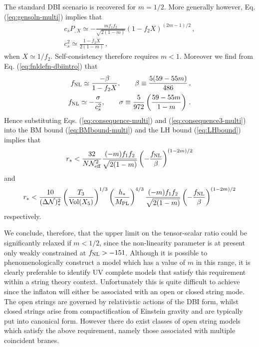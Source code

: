 The standard DBI scenario is recovered for $m=1/2$. 
More generally however, Eq. (\ref{eq:gensoln-multi}) implies that  
% 
\begin{eqnarray}
\label{eq:consequence-multi}
c_sP_{,X} \simeq -\frac{m f_1 f_2}{\sqrt{2(1-m)}} \left( 
1- f_2X \right)^{(2m-1)/2} \,,
\\
c_s^2 \simeq \frac{1-f_2X}{2(1-m)} \,,
\end{eqnarray}
% 
when $X \simeq 1/f_2$. Self-consistency therefore
requires $m<1$. Moreover
we find from Eq. (\ref{eq:fnldefn-dbiintro}) that
%  
\begin{eqnarray}
\label{eq:consequence3-multi}
f_{\mathrm{NL}} \simeq \frac{-\beta}{1-f_2X} , \qquad \beta \equiv \frac{5(59-55m)}{486}
\,,
\\
\label{eq:consequence4-multi}
f_{\mathrm{NL}} \simeq -\frac{\sigma}{c_s^2}, \qquad \sigma \equiv 
\frac{5}{972} \left( \frac{59-55m}{1-m} \right) \,.
\end{eqnarray}
% 
Hence substituting Eqs. (\ref{eq:consequence-multi}) and (\ref{eq:consequence3-multi}) 
into the BM bound (\ref{eq:BMbound-multi}) and the LH bound (\ref{eq:LHbound}) implies that
%  
\begin{equation}
\label{eq:weakBM-multi}
r_*< \frac{32}{N {\cal{N}}_{\rm eff}^2} \frac{(-m) f_1 f_2}{\sqrt{2(1-m)}}
\left( -\frac{f_{\mathrm{NL}}}{\beta} \right)^{(1-2m)/2}
\end{equation}
% 
and
%  
\begin{equation}
\label{eq:weakLH-multi}
r_* < \frac{10}{(\Delta {\cal{N}})_*^2} \left( \frac{T_3}{\mathrm{Vol} (X_5)} \right)^{1/3} 
\left( \frac{h_*}{M_{\mathrm{PL}}} \right)^{4/3}
\frac{(-m) f_1 f_2}{\sqrt{2(1-m)}}
\left( -\frac{f_{\mathrm{NL}}}{\beta} \right)^{(1-2m)/2}
\end{equation}
% 
respectively. 


We conclude, therefore, that 
the upper limit on the tensor-scalar ratio could be significantly 
relaxed if $m <1/2$, since the non-linearity parameter is at present only 
weakly constrained at $f_{\mathrm{NL}} >-151$. Although it is possible 
to phenomenologically construct a model which has a value of $m$ in this 
range, it is clearly preferable to identify  UV complete models
that satisfy this requirement within a string theory context. 
Unfortunately this is quite difficult to achieve since the inflaton 
will either be associated with an open or closed string mode. 
The open strings are governed by relativistic actions of the 
DBI form, whilst closed strings arise from compactification of Einstein gravity
and are typically put into canonical form.
However there do exist classes of open string
models which satisfy the above requirement, 
namely those associated with multiple coincident branes.


